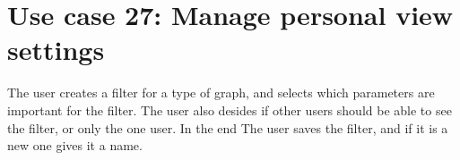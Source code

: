 \section{Use case 27: Manage personal view settings}
\label{app:usecase:viewsettings}
The user creates a filter for a type of graph, and selects which parameters are
important for the filter. The user also desides if other users should be able to
see the filter, or only the one user. In the end The user saves the filter, and
if it is a new one gives it a name.